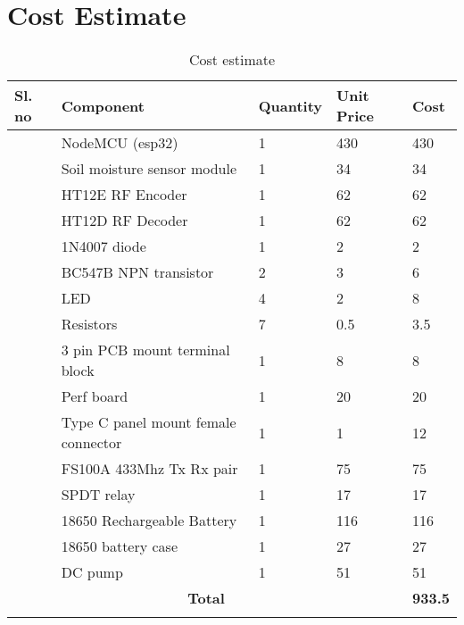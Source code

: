 \newpage
\chapter{Cost Estimate}
\renewcommand{\arraystretch}{1.5}

\newcommand\rnum{\stepcounter{tocostnum}\arabic{tocostnum}}

\begin{longtable}[h!]{|l|l|l|l|l|} \hline
\textbf{Sl. no} & \textbf{Component}            & \textbf{Quantity} & \textbf{Unit Price} & \textbf{Cost} \\ \hline
	\rnum  & NodeMCU (esp32)                    & 1        & 430        & 430  \\ \hline
	\rnum  & Soil moisture sensor module        & 1        &  34        & 34   \\ \hline
	\rnum  & HT12E RF Encoder                   & 1        &  62        & 62   \\ \hline
	\rnum  & HT12D RF Decoder                   & 1        &  62        & 62   \\ \hline
	\rnum  & 1N4007 diode                       & 1        &   2        & 2    \\ \hline
	\rnum  & BC547B NPN transistor              & 2        &   3        & 6    \\ \hline
	\rnum  & LED                                & 4        &   2        & 8    \\ \hline
	\rnum  & Resistors                          & 7        &   0.5      & 3.5  \\ \hline
	\rnum  & 3 pin PCB mount terminal block     & 1        &   8        & 8    \\ \hline
	\rnum  & Perf board                         & 1        &  20        & 20   \\ \hline
	\rnum  & Type C panel mount female connector& 1        &   1        & 12   \\ \hline
	\rnum  & FS100A 433Mhz Tx Rx pair           & 1        &  75        & 75   \\ \hline
	\rnum  & SPDT relay                         & 1        &  17        & 17   \\ \hline
	\rnum  & 18650 Rechargeable Battery         & 1        & 116        & 116  \\ \hline
	\rnum  & 18650 battery case                 & 1        &  27        & 27   \\ \hline
	\rnum  & DC pump                            & 1        &  51        & 51   \\ \hline
	\multicolumn{4}{|c|}{\textbf{Total}}& \textbf{933.5} \\ \hline
	\caption{Cost estimate}
\end{longtable}
